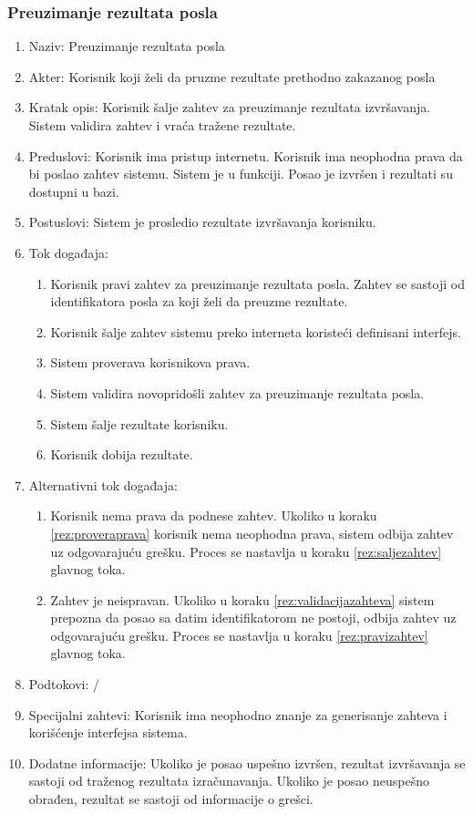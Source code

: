 \documentclass[12pt,oneside]{memoir}
\begin{document}
\subsubsection{Preuzimanje rezultata posla}
\begin{enumerate}
\item Naziv: Preuzimanje rezultata posla
\item Akter: Korisnik koji želi da pruzme rezultate prethodno zakazanog posla
\item Kratak opis: Korisnik šalje zahtev za preuzimanje rezultata izvršavanja. Sistem validira zahtev i vraća tražene rezultate.
\item Preduslovi: Korisnik ima pristup internetu. Korisnik ima neophodna prava da bi poslao zahtev sistemu. Sistem je u funkciji. Posao je izvršen i rezultati su dostupni u bazi.
\item Postuslovi: Sistem je prosledio rezultate izvršavanja korisniku.
\item Tok događaja:
	\begin{enumerate}
	\item \label{rez:pravizahtev} Korisnik pravi zahtev za preuzimanje rezultata posla. Zahtev se sastoji od identifikatora posla za koji želi da preuzme rezultate.
	\item \label{rez:saljezahtev} Korisnik šalje zahtev sistemu preko interneta koristeći definisani interfejs.
	\item \label{rez:proveraprava} Sistem proverava korisnikova prava.
	\item \label{rez:validacijazahteva} Sistem validira novopridošli zahtev za preuzimanje rezultata posla.
	\item \label{rez:sinhslanjerez} Sistem šalje rezultate korisniku.
	\item Korisnik dobija rezultate.
	\end{enumerate}
\item Alternativni tok događaja:
	\begin{enumerate}
	\item Korisnik nema prava da podnese zahtev. Ukoliko u koraku \ref{rez:proveraprava} korisnik nema neophodna prava, sistem odbija zahtev uz odgovarajuću grešku. Proces se nastavlja u koraku \ref{rez:saljezahtev} glavnog toka.
	\item Zahtev je neispravan. Ukoliko u koraku \ref{rez:validacijazahteva} sistem prepozna da posao sa datim identifikatorom ne postoji, odbija zahtev uz odgovarajuću grešku. Proces se nastavlja u koraku \ref{rez:pravizahtev} glavnog toka.
	\end{enumerate}
\item Podtokovi: /
\item Specijalni zahtevi: Korisnik ima neophodno znanje za generisanje zahteva i korišćenje interfejsa sistema.
\item Dodatne informacije: Ukoliko je posao uspešno izvršen, rezultat izvršavanja se sastoji od traženog rezultata izračunavanja. Ukoliko je posao neuspešno obrađen, rezultat se sastoji od informacije o grešci.
\end{enumerate}
\end{document}
